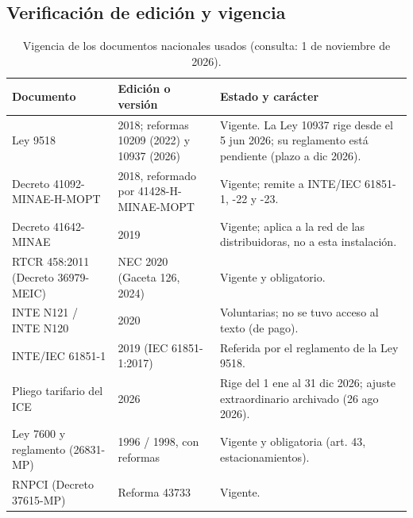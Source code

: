 \subsection{Verificación de edición y vigencia}
\begin{table}[H]
\centering\small
\caption{Vigencia de los documentos nacionales usados (consulta: 1 de noviembre de 2026).}\label{tab:vigencia}
\begin{tabularx}{\textwidth}{L{5.0cm}L{3.4cm}Y}
\toprule
\textbf{Documento} & \textbf{Edición o versión} & \textbf{Estado y carácter}\\
\midrule
Ley 9518 & 2018; reformas 10209 (2022) y 10937 (2026) & Vigente. La Ley 10937 rige desde el 5 jun 2026; su reglamento está pendiente (plazo a dic 2026).\\
Decreto 41092-MINAE-H-MOPT & 2018, reformado por 41428-H-MINAE-MOPT & Vigente; remite a INTE/IEC 61851-1, -22 y -23.\\
Decreto 41642-MINAE & 2019 & Vigente; aplica a la red de las distribuidoras, no a esta instalación.\\
RTCR 458:2011 (Decreto 36979-MEIC) & NEC 2020 (Gaceta 126, 2024) & Vigente y obligatorio.\\
INTE N121 / INTE N120 & 2020 & Voluntarias; no se tuvo acceso al texto (de pago).\\
INTE/IEC 61851-1 & 2019 (IEC 61851-1:2017) & Referida por el reglamento de la Ley 9518.\\
Pliego tarifario del ICE & 2026 & Rige del 1 ene al 31 dic 2026; ajuste extraordinario archivado (26 ago 2026).\\
Ley 7600 y reglamento (26831-MP) & 1996 / 1998, con reformas & Vigente y obligatoria (art. 43, estacionamientos).\\
RNPCI (Decreto 37615-MP) & Reforma 43733 & Vigente.\\
\bottomrule
\end{tabularx}
\end{table}
